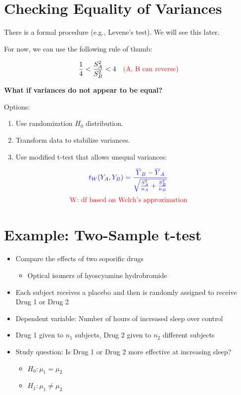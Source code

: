 \documentclass[14pt]{extarticle}
\begin{document}
\newpage
\section*{Checking Equality of Variances}

There is a formal procedure (e.g., Levene's test). We will see this later.

\noindent For now, we can use the following rule of thumb:

\[
\frac{1}{4} < \frac{S_A^2}{S_B^2} < 4 \quad \textcolor{red}{\text{(A, B can reverse)}}
\]

\noindent \textbf{What if variances do not appear to be equal?}

Options:
\begin{enumerate}
    \item Use randomization $H_0$ distribution.
    \item Transform data to stabilize variances.
    \item Use modified t-test that allows unequal variances:
\end{enumerate}

\[
\textcolor{blue}{t_W(Y_A, Y_B) = \frac{\overline{Y}_B - \overline{Y}_A}{\sqrt{\frac{S_A^2}{n_A} + \frac{S_B^2}{n_B}}}}
\]
\[
\textcolor{red}{\text{W: df based on Welch's approximation}}
\]

\section*{Example: Two-Sample t-test}

\begin{itemize}
    \item Compare the effects of two soporific drugs
    \begin{itemize}
        \item Optical isomers of hyoscyamine hydrobromide
    \end{itemize}
    
    \item Each subject receives a placebo and then is randomly assigned to receive Drug 1 or Drug 2
    
    \item Dependent variable: Number of hours of increased sleep over control
    
    \item Drug 1 given to $n_1$ subjects, Drug 2 given to $n_2$ different subjects
    
    \item Study question: Is Drug 1 or Drug 2 more effective at increasing sleep?
    \begin{itemize}
        \item $H_0: \mu_1 = \mu_2$
        \item $H_1: \mu_1 \neq \mu_2$
    \end{itemize}
\end{itemize}
\end{document}
